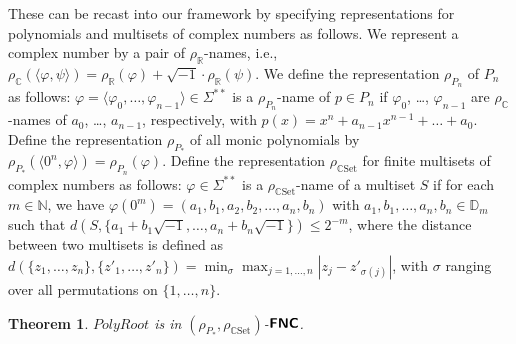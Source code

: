 \documentclass[conference]{IEEEtran}
\newcommand{\R}{\mathbb R}
\newcommand{\N}{\mathbb N}
\newcommand{\C}{\mathbb C}
\newcommand{\D}{\mathbb D}
\newcommand{\classtwofont}[1]{\text{\bfseries \sffamily \upshape #1}}
\newcommand{\classFLtwo}{\classtwofont{FL}}
\newcommand{\classFNCtwo}{\classtwofont{FNC}}
\newcommand{\rhoR}{\rho _\R}
\newcommand{\rhoCSet}{\rho_{\C\mathrm{Set}}}
\newcommand{\LM}{\varSigma ^{**}}
\newcommand{\OpPolyRoot}{\mathit{PolyRoot}}
\newtheorem{theorem}{Theorem}[section]
\newtheorem{lemma}[theorem]{Lemma}
\newtheorem{corollary}[theorem]{Corollary}
\theoremstyle{definition}
\theoremstyle{remark}
\begin{document}
These can be recast into our framework by specifying 
representations for polynomials and multisets of complex numbers as follows.
We represent a complex number by a pair of $\rhoR$-names,
i.e., $
 \rho_\C (\langle \varphi, \psi \rangle) 
= 
 \rhoR (\varphi) + \sqrt{-1} \cdot \rhoR (\psi)
$.  We define the representation $\rho_{P_n}$ of 
$P _n$ as follows: 
$\varphi = \langle \varphi _0, \ldots, \varphi _{n - 1} \rangle \in \LM$ 
is a $\rho_{P_n}$-name of $p \in P_n$ if 
$\varphi _0$, \ldots, $\varphi _{n - 1}$ are 
$\rho_{\C}$-names of $a _0$, \ldots, $a _{n - 1}$, respectively, 
with $p(x) = x^n + a_{n-1}x^{n-1} + \dots + a_0$.
Define the representation $\rho_{P_*}$ of all monic polynomials by
$\rho_{P_*}(\langle 0^n, \varphi \rangle) = \rho_{P_n}(\varphi)$.
Define the representation $\rhoCSet$ for finite multisets of complex numbers 
as follows:
$\varphi \in \LM$ is a $\rhoCSet$-name of a multiset $S$ if 
for each $m \in \N$, 
we have $\varphi(0 ^m) = ( a_1, b_1, a_2, b_2, \dots, a_n, b_n )$
with $a_1, b_1, \dots, a_n, b_n \in \D_m$
such that 
$d(S, \{a_1 + b_1 \sqrt{-1}, \dots, a_n + b_n \sqrt{-1}\}) \le 2^{-m}$, 
where the distance between two multisets is defined as $
 d (\{z_1, \dots, z_n\}, \{z'_1, \dots, z'_n\}) 
= 
 \min_{\sigma} \max_{j = 1, \ldots, n}|z_j - z'_{\sigma(j)}|
$, with $\sigma$ ranging over all permutations on $\{1, \ldots, n\}$. 


\begin{theorem}
 \label{theorem:finding-roots-is-in-NC}
 $\OpPolyRoot$ is in $(\rho_{P_*}, \rhoCSet)$-$\classFNCtwo$.
\end{theorem}

\end{document}
